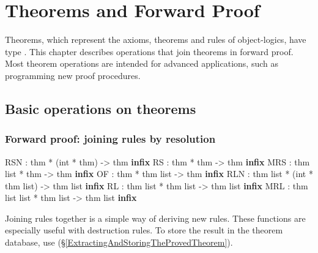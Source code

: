 
\chapter{Theorems and Forward Proof}

Theorems, which represent the axioms, theorems and rules of
object-logics, have type .  This chapter describes
operations that join theorems in forward proof.  Most theorem
operations are intended for advanced applications, such as programming
new proof procedures.


\section{Basic operations on theorems}

\subsection{Forward proof: joining rules by resolution}
\begin{ttbox} 
RSN : thm * (int * thm) -> thm                 \hfill\textbf{infix}
RS  : thm * thm -> thm                         \hfill\textbf{infix}
MRS : thm list * thm -> thm                    \hfill\textbf{infix}
OF  : thm * thm list -> thm                    \hfill\textbf{infix}
RLN : thm list * (int * thm list) -> thm list  \hfill\textbf{infix}
RL  : thm list * thm list -> thm list          \hfill\textbf{infix}
MRL : thm list list * thm list -> thm list     \hfill\textbf{infix}
\end{ttbox}
Joining rules together is a simple way of deriving new rules.  These
functions are especially useful with destruction rules.  To store
the result in the theorem database, use 
(\S\ref{ExtractingAndStoringTheProvedTheorem}). 
